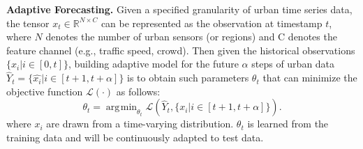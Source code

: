 \documentclass[sigconf]{acmart}
\begin{document}
\noindent\textbf{Adaptive Forecasting.} Given a specified granularity of urban time series data, the tensor $x_{t}\in \mathbb{R}^{N\times C}$ can be represented as the observation at timestamp $t$, where $N$ denotes the number of urban sensors (or regions) and C denotes the feature channel (e.g., traffic speed, crowd). Then given the historical observations $\{x_{i}|i\in[0,t]\}$, building adaptive model for the future $\alpha$ steps of urban data $\hat{Y}_{t} = \{\hat{x_{i}}|i\in[t+1,t+\alpha]\}$ is to obtain such parameters $\theta_{t}$ that can minimize the objective function $\mathcal{L(\cdot)}$ as follows:
\begin{equation}
\theta_{t} = \mathop{\arg\!min}_{\theta_{t}}{\mathcal{L}(\hat{Y}_{t},\{x_{i}|i\in[t+1,t+\alpha]\})}.
\end{equation}
where $x_{i}$ are drawn from a time-varying distribution. $\theta_{t}$ is learned from the training data and will be continuously adapted to test data.
\end{document}
